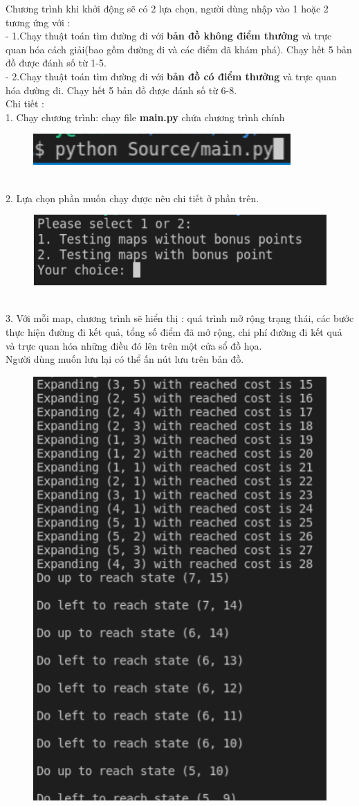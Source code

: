 \documentclass[11pt]{article} %
\begin{document}
Chương trình khi khởi động sẽ có 2 lựa chọn, người dùng nhập vào 1 hoặc 2 tương ứng với :\\
- 1.Chạy thuật toán tìm đường đi với \textbf{bản đồ không điểm thưởng} và trực quan hóa cách giải(bao gồm đường đi và các điểm đã khám phá). Chạy hết 5 bản đồ được đánh số từ 1-5.\\
- 2.Chạy thuật toán tìm đường đi với \textbf{bản đồ có điểm thưởng} và trực quan hóa đường đi. Chạy hết 5 bản đồ được đánh số từ 6-8.\\
Chi tiết :\\
1. Chạy chương trình: chạy file \textbf{main.py} chứa chương trình chính
\begin{figure}[h] 
	\centering
	\includegraphics[width=0.5\columnwidth]{Figures/hdsd_1.png}
\end{figure}\\
2. Lựa chọn phần muốn chạy được nêu chi tiết ở phần trên.
\begin{figure}[h] 
	\centering
	\includegraphics[width=0.5\columnwidth]{Figures/hdsd_3.png}
\end{figure}\\
3. Với mỗi map, chương trình sẽ hiển thị : quá trình mở rộng trạng thái, các bước thực hiện đường đi kết quả, tổng số điểm đã mở rộng, chi phí đường đi kết quả và trực quan hóa những điều đó lên trên một cửa sổ đồ họa. \\ Người dùng muốn lưu lại có thể ấn nút lưu trên bản đồ.\\
\begin{figure}[h] 
	\centering
	\includegraphics[width=0.5\columnwidth]{Figures/hdsd_4.png}
\end{figure}\\
\end{document}
